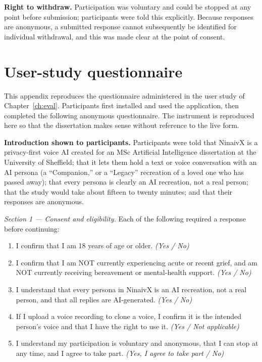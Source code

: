 \documentclass[11pt,a4paper]{report}
\begin{document}
\textbf{Right to withdraw.} Participation was voluntary and could be stopped at any point before submission; participants were told this explicitly. Because responses are anonymous, a submitted response cannot subsequently be identified for individual withdrawal, and this was made clear at the point of consent.

\chapter{User-study questionnaire}
\label{app:questionnaire}
This appendix reproduces the questionnaire administered in the user study of Chapter~\ref{ch:eval}. Participants first installed and used the application, then completed the following anonymous questionnaire. The instrument is reproduced here so that the dissertation makes sense without reference to the live form.

\textbf{Introduction shown to participants.} Participants were told that NinaivX is a privacy-first voice AI created for an MSc Artificial Intelligence dissertation at the University of Sheffield; that it lets them hold a text or voice conversation with an AI persona (a ``Companion,'' or a ``Legacy'' recreation of a loved one who has passed away); that every persona is clearly an AI recreation, not a real person; that the study would take about fifteen to twenty minutes; and that their responses are anonymous.

\textit{Section 1 --- Consent and eligibility.} Each of the following required a response before continuing:
\begin{enumerate}[itemsep=2pt]
  \item I confirm that I am 18 years of age or older. \emph{(Yes / No)}
  \item I confirm that I am NOT currently experiencing acute or recent grief, and am NOT currently receiving bereavement or mental-health support. \emph{(Yes / No)}
  \item I understand that every persona in NinaivX is an AI recreation, not a real person, and that all replies are AI-generated. \emph{(Yes / No)}
  \item If I upload a voice recording to clone a voice, I confirm it is the intended person's voice and that I have the right to use it. \emph{(Yes / Not applicable)}
  \item I understand my participation is voluntary and anonymous, that I can stop at any time, and I agree to take part. \emph{(Yes, I agree to take part / No)}
\end{enumerate}
\end{document}
